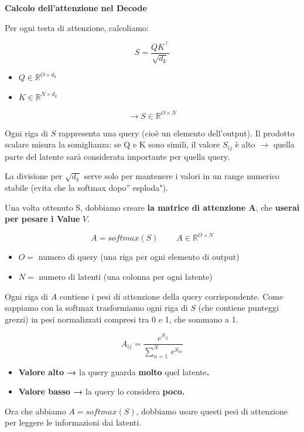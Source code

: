 \documentclass[
  11pt,
]{article}
\begin{document}
\textbf{Calcolo dell'attenzione nel Decode}

Per ogni testa di attenzione, calcoliamo:

\[S = \frac{QK^{\top}}{\sqrt{d_{k}}}\]

\begin{itemize}
\item
  \(Q \in \mathbb{R}^{O \times d_{k}}\)
\item
  \(K \in \mathbb{R}^{N \times d_{k}}\)
\end{itemize}

\[\rightarrow S \in \mathbb{R}^{O \times N}\]

Ogni riga di \(S\) rappresenta una query (cioè un elemento
dell'output). Il prodotto scalare misura la somiglianza:
se Q e K sono simili, il valore \(S_{ij}\) è alto \(\rightarrow\) quella
parte del latente sarà considerata importante per quella query.

La divisione per \(\sqrt{d_{k}}\) serve solo per mantenere i valori in
un range numerico stabile (evita che la softmax dopo'' esploda").

Una volta ottenuto S, dobbiamo creare \textbf{la matrice di attenzione
A}, che \textbf{userai per pesare i Value} \(V\).

\[A = softmax(S)\ \ \ \ \ \ \ \ \ \ A \in \mathbb{R}^{O \times N}\]

\begin{itemize}
\item
  \(O =\) numero di query (una riga per ogni elemento di output)
\item
  \(N =\) numero di latenti (una colonna per ogni latente)
\end{itemize}

Ogni riga di \(A\) contiene i pesi di attenzione della query
corrispondente. Come sappiamo con la softmax trasformiamo ogni riga di
\(S\) (che contiene punteggi grezzi) in pesi normalizzati compresi tra 0
e 1, che sommano a 1.

\[A_{ij} = \frac{e^{S_{ij}}}{\sum_{n = 1}^{N}\, e^{S_{in}}}\]

\begin{itemize}
\item
  \textbf{Valore alto →} la query guarda \textbf{molto} quel
  latente\textbf{.}
\item
  \textbf{Valore basso →} la query lo considera \textbf{poco.}
\end{itemize}

Ora che abbiamo \(A = softmax(S)\), dobbiamo usare questi pesi di
attenzione per leggere le informazioni dai latenti.
\end{document}
